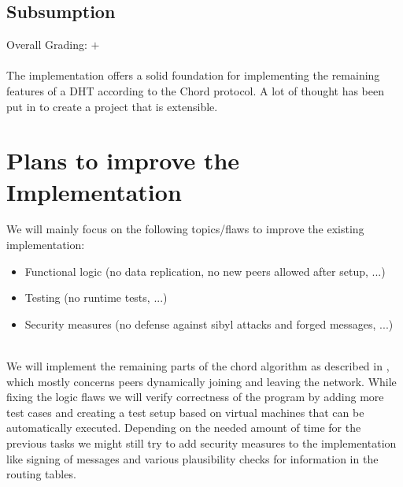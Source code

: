 \documentclass[a4paper, 11pt]{article}
\begin{document}
\subsection*{Subsumption}
Overall Grading: $+$\\
\\
The implementation offers a solid foundation for implementing the remaining features of a DHT according to the Chord protocol. 
A lot of thought has been put in to create a project that is extensible.

\section*{Plans to improve the Implementation}
We will mainly focus on the following topics/flaws to improve the existing implementation:

\begin{itemize}
	\item Functional logic (no data replication, no new peers allowed after setup, ...)
	\item Testing (no runtime tests, ...)
	\item Security measures (no defense against sibyl attacks and forged messages, ...)
\end{itemize}
\\
We will implement the remaining parts of the chord algorithm as described in \cite{stoica2001chord}, which mostly concerns peers dynamically joining and leaving the network. 
While fixing the logic flaws we will verify correctness of the program by adding more test cases and creating a test setup based on virtual machines that can be automatically executed.
Depending on the needed amount of time for the previous tasks we might still try to add security measures to the implementation like signing of messages and various plausibility checks for information in the routing tables.
\end{document}
